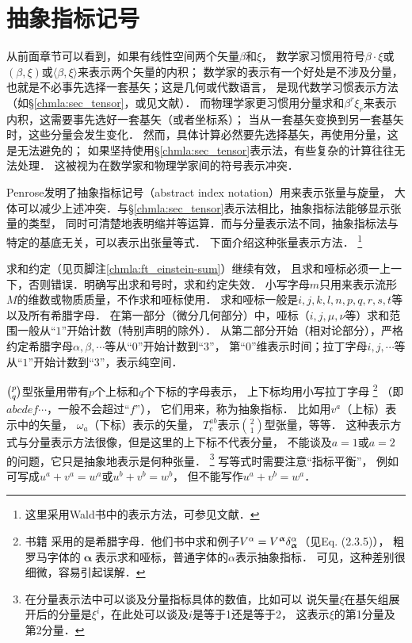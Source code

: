 \section{抽象指标记号}\label{chmla:sec_abstract-index-notation}
从前面章节可以看到，如果有线性空间两个矢量$\beta$和$\xi$，
数学家习惯用符号$\beta\cdot\xi$或$(\beta,\xi)$或$\langle \beta,\xi \rangle$来表示两个矢量的内积；
数学家的表示有一个好处是不涉及分量，也就是不必事先选择一套基矢；这是几何或代数语言，
是现代数学习惯表示方法（如\S \ref{chmla:sec_tensor}，或见文献\parencite{cc2001-zh}）．
而物理学家更习惯用分量求和$\beta^r \xi_r$来表示内积，这需要事先选好一套基矢（或者坐标系）；
当从一套基矢变换到另一套基矢时，这些分量会发生变化．
然而，具体计算必然要先选择基矢，再使用分量，这是无法避免的；
如果坚持使用\S \ref{chmla:sec_tensor}表示法，有些复杂的计算往往无法处理．
这被视为在数学家和物理学家间的符号表示冲突．


Penrose\cite[Ch. 2]{penrose-Rindler1984}发明了抽象指标记号（abstract index notation）用来表示张量与旋量，
大体可以减少上述冲突．与\S \ref{chmla:sec_tensor}表示法相比，抽象指标法能够显示张量的类型，
同时可清楚地表明缩并等运算．而与分量表示法不同，抽象指标法与特定的基底无关，可以表示出张量等式．
下面介绍这种张量表示方法．
{\footnote{这里采用Wald书中的表示方法，可参见文献\parencite[\S 2.6]{liang_zhou2006_1}．}}

 求和约定（见\pageref{chmla:ft_einstein-sum}页脚注\ref{chmla:ft_einstein-sum}）继续有效，
且求和哑标必须一上一下，否则错误．明确写出求和号时，求和约定失效．
小写字母$m$只用来表示流形$M$的维数或物质质量，不作求和哑标使用．
求和哑标一般是$i,j,k,l,n,p,q,r,s,t$等以及所有希腊字母．
在第一部分（微分几何部分）中，哑标（$i,j,\mu,\nu$等）求和范围一般从“$1$”开始计数（特别声明的除外）．
从第二部分开始（相对论部分），严格约定希腊字母$\alpha,\beta,\cdots$等从“$0$”开始计数到“$3$”，
第“$0$”维表示时间；拉丁字母$i,j,\cdots $等从“$1$”开始计数到“$3$”，表示纯空间．


 $\binom{p}{q}$型张量用带有$p$个上标和$q$个下标的字母表示，
上下标均用小写拉丁字母
{\footnote{\textcite[Ch. 2]{penrose-Rindler1984}书籍
        采用的是希腊字母．他们书中求和例子$V^\alpha=V^{\boldsymbol{\upalpha}}
        \delta_{\rm \boldsymbol{\upalpha}}^\alpha$（见Eq. (2.3.5)），
        粗罗马字体的${\boldsymbol{\upalpha}}$表示求和哑标，普通字体的$\alpha$表示抽象指标．
    可见，这种差别很细微，容易引起误解．}}
（即$abcdef\cdots$，一般不会超过“$f$”），
它们用来，称为抽象指标．
比如用$v^a$（上标）表示中的矢量，
$\omega_a$（下标）表示的矢量，
$T_{c}^{ab}$表示$\binom{2}{1}$型张量，等等．
这种表示方式与分量表示方法很像，但是这里的上下标不代表分量，
不能谈及$a=1$或$a=2$的问题，它只是{\kaishu 抽象}地表示是何种张量．
{\footnote{在分量表示法中可以谈及分量指标具体的数值，比如可以
        说矢量$\xi$在基矢组展开后的分量是$\xi ^i$，在此处可以谈及$i$是等于1还是等于2，
        这表示$\xi$的第1分量及第2分量．}}
写等式时需要注意“指标平衡”，
例如可写成$u^a + v^a = w^a$或$u^b + v^b = w^b$，
但不能写作$u^a + v^b = w^a$．


